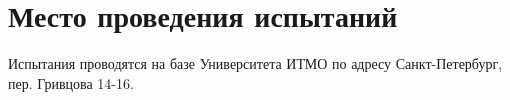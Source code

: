 \section{Место проведения испытаний}
Испытания проводятся на базе Университета ИТМО по адресу Санкт-Петербург, пер. Гривцова 14-16.
